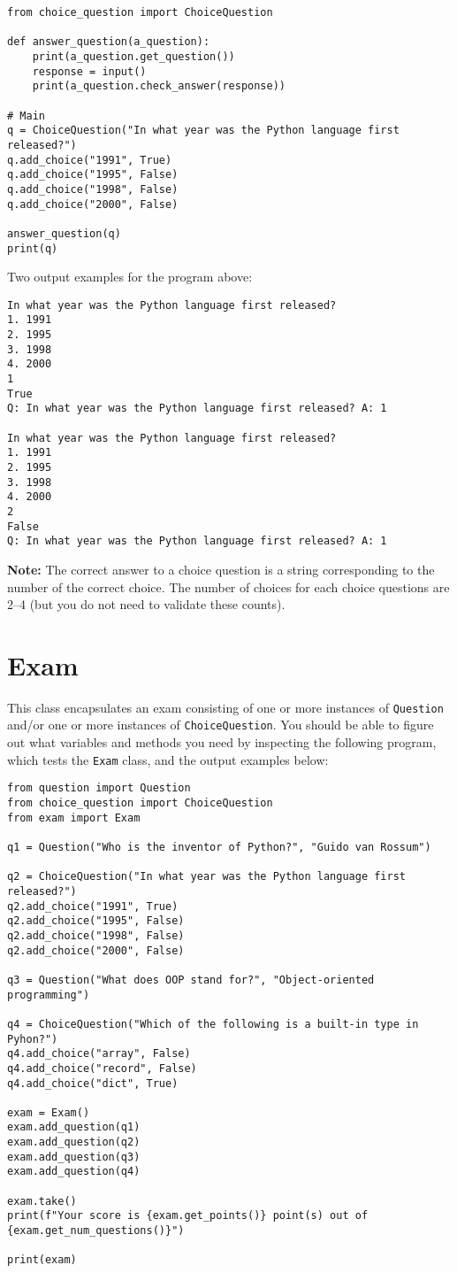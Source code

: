 \begin{verbatim}
from choice_question import ChoiceQuestion

def answer_question(a_question):
    print(a_question.get_question())
    response = input()
    print(a_question.check_answer(response))

# Main
q = ChoiceQuestion("In what year was the Python language first released?")
q.add_choice("1991", True)
q.add_choice("1995", False)
q.add_choice("1998", False)
q.add_choice("2000", False)

answer_question(q)
print(q)
\end{verbatim}

\noindent
Two output examples for the program above:

\begin{verbatim}
In what year was the Python language first released?
1. 1991
2. 1995
3. 1998
4. 2000
1
True
Q: In what year was the Python language first released? A: 1

In what year was the Python language first released?
1. 1991
2. 1995
3. 1998
4. 2000
2
False
Q: In what year was the Python language first released? A: 1
\end{verbatim}

\noindent
\textbf{Note:} The correct answer to a choice question is a string corresponding to the number of the correct choice.
The number of choices for each choice questions are 2--4 (but you do not need to validate these counts).

\section*{Exam}
This class encapsulates an exam consisting of one or more instances of \texttt{Question} and/or one or more instances of \texttt{ChoiceQuestion}.  
You should be able to figure out what variables and methods you need by inspecting the following program, which tests the \texttt{Exam} class, and the output examples below:

\begin{verbatim}
from question import Question
from choice_question import ChoiceQuestion
from exam import Exam

q1 = Question("Who is the inventor of Python?", "Guido van Rossum")

q2 = ChoiceQuestion("In what year was the Python language first released?")
q2.add_choice("1991", True)
q2.add_choice("1995", False)
q2.add_choice("1998", False)
q2.add_choice("2000", False)

q3 = Question("What does OOP stand for?", "Object-oriented programming")

q4 = ChoiceQuestion("Which of the following is a built-in type in Pyhon?")
q4.add_choice("array", False)
q4.add_choice("record", False)
q4.add_choice("dict", True)

exam = Exam()
exam.add_question(q1)
exam.add_question(q2)
exam.add_question(q3)
exam.add_question(q4)

exam.take()
print(f"Your score is {exam.get_points()} point(s) out of {exam.get_num_questions()}")

print(exam)
\end{verbatim}

